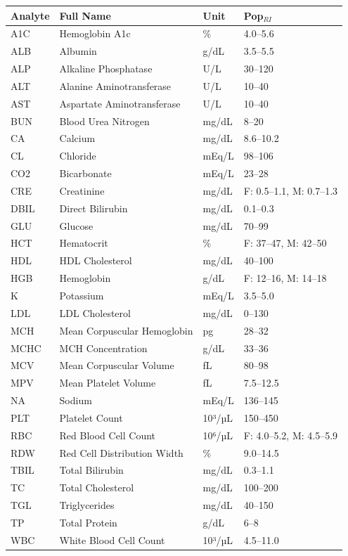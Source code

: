 \begin{table}[ht]
\centering
\footnotesize
\begin{tabular}{llll}
\toprule
Analyte & Full Name & Unit & Pop$_{RI}$ \\
\midrule
A1C & Hemoglobin A1c & \% & 4.0--5.6 \\
ALB & Albumin & g/dL & 3.5--5.5 \\
ALP & Alkaline Phosphatase & U/L & 30--120 \\
ALT & Alanine Aminotransferase & U/L & 10--40 \\
AST & Aspartate Aminotransferase & U/L & 10--40 \\
BUN & Blood Urea Nitrogen & mg/dL & 8--20 \\
CA & Calcium & mg/dL & 8.6--10.2 \\
CL & Chloride & mEq/L & 98--106 \\
CO2 & Bicarbonate & mEq/L & 23--28 \\
CRE & Creatinine & mg/dL & F: 0.5--1.1, M: 0.7--1.3 \\
DBIL & Direct Bilirubin & mg/dL & 0.1--0.3 \\
GLU & Glucose & mg/dL & 70--99 \\
HCT & Hematocrit & \% & F: 37--47, M: 42--50 \\
HDL & HDL Cholesterol & mg/dL & 40--100 \\
HGB & Hemoglobin & g/dL & F: 12--16, M: 14--18 \\
K & Potassium & mEq/L & 3.5--5.0 \\
LDL & LDL Cholesterol & mg/dL & 0--130 \\
MCH & Mean Corpuscular Hemoglobin & pg & 28--32 \\
MCHC & MCH Concentration & g/dL & 33--36 \\
MCV & Mean Corpuscular Volume & fL & 80--98 \\
MPV & Mean Platelet Volume & fL & 7.5--12.5 \\
NA & Sodium & mEq/L & 136--145 \\
PLT & Platelet Count & 10³/µL & 150--450 \\
RBC & Red Blood Cell Count & 10⁶/µL & F: 4.0--5.2, M: 4.5--5.9 \\
RDW & Red Cell Distribution Width & \% & 9.0--14.5 \\
TBIL & Total Bilirubin & mg/dL & 0.3--1.1 \\
TC & Total Cholesterol & mg/dL & 100--200 \\
TGL & Triglycerides & mg/dL & 40--150 \\
TP & Total Protein & g/dL & 6--8 \\
WBC & White Blood Cell Count & 10³/µL & 4.5--11.0 \\
\bottomrule
\end{tabular}
\label{tab:03_analyte_reference}
\end{table}